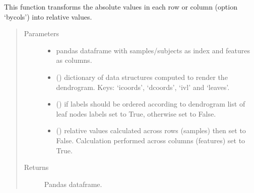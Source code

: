 \documentclass[letterpaper,10pt,english]{sphinxmanual}
\begin{document}
\begin{fulllineitems}
\label{\detokenize{_autosummary/analytics_core.analytics:analytics_core.analytics.wgcnaAnalysis.get_percentiles_heatmap}}
This function transforms the absolute values in each row or column (option ‘bycols’) into relative values.
\begin{quote}\begin{description}
\item[{Parameters}] \leavevmode\begin{itemize}
\item {} 
 \textendash{} pandas dataframe with samples/subjects as index and features as columns.

\item {} 
 () \textendash{} dictionary of data structures computed to render the dendrogram. Keys: ‘icoords’, ‘dcoords’, ‘ivl’ and ‘leaves’.

\item {} 
 () \textendash{} if labels should be ordered according to dendrogram list of leaf nodes labels set to True, otherwise set to False.

\item {} 
 () \textendash{} relative values calculated across rows (samples) then set to False. Calculation performed across columns (features) set to True.

\end{itemize}

\item[{Returns}] \leavevmode
Pandas dataframe.

\end{description}\end{quote}

\end{fulllineitems}
\end{document}
